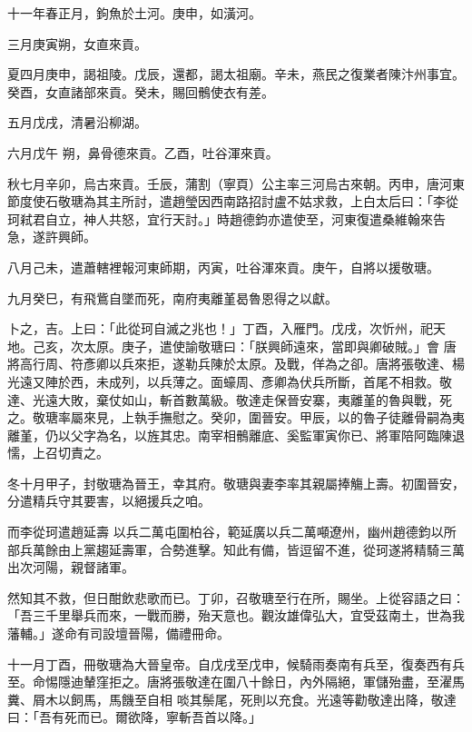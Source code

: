 \begin{pinyinscope}
 十一年春正月，鉤魚於土河。庚申，如潢河。



 三月庚寅朔，女直來貢。



 夏四月庚申，謁祖陵。戊辰，還都，謁太祖廟。辛未，燕民之復業者陳汴州事宜。癸酉，女直諸部來貢。癸未，賜回鶻使衣有差。



 五月戊戌，清暑沿柳湖。



 六月戊午
 朔，鼻骨德來貢。乙酉，吐谷渾來貢。



 秋七月辛卯，烏古來貢。壬辰，蒲割（寧頁）公主率三河烏古來朝。丙申，唐河東節度使石敬瑭為其主所討，遣趙瑩因西南路招討盧不姑求救，上白太后曰：「李從珂弒君自立，神人共怒，宜行天討。」時趙德鈞亦遣使至，河東復遣桑維翰來告急，遂許興師。



 八月己未，遣蕭轄裡報河東師期，丙寅，吐谷渾來貢。庚午，自將以援敬瑭。



 九月癸巳，有飛鴜自墜而死，南府夷離堇曷魯恩得之以獻。



 卜之，吉。上曰：「此從珂自滅之兆也！」丁酉，入雁門。戊戌，次忻州，祀天地。己亥，次太原。庚子，遣使諭敬瑭曰：「朕興師遠來，當即與卿破賊。」會
 唐將高行周、符彥卿以兵來拒，遂勒兵陳於太原。及戰，佯為之卻。唐將張敬達、楊光遠又陣於西，未成列，以兵薄之。面蠔周、彥卿為伏兵所斷，首尾不相救。敬達、光遠大敗，棄仗如山，斬首數萬級。敬達走保晉安寨，夷離堇的魯與戰，死之。敬瑭率屬來見，上執手撫慰之。癸卯，圍晉安。甲辰，以的魯子徒離骨嗣為夷離堇，仍以父字為名，以旌其忠。南宰相鶻離底、奚監軍寅你已、將軍陪阿臨陳退懦，上召切責之。



 冬十月甲子，封敬瑭為晉王，幸其府。敬瑭與妻李率其親屬捧觴上壽。初圍晉安，分遣精兵守其要害，以絕援兵之咱。



 而李從珂遣趙延壽
 以兵二萬屯圍柏谷，範延廣以兵二萬噸遼州，幽州趙德鈞以所部兵萬餘由上黨趨延壽軍，合勢進擊。知此有備，皆逗留不進，從珂遂將精騎三萬出次河陽，親督諸軍。



 然知其不救，但日酣飲悲歌而已。丁卯，召敬瑭至行在所，賜坐。上從容語之曰：「吾三千里舉兵而來，一戰而勝，殆天意也。觀汝雄偉弘大，宜受茲南土，世為我藩輔。」遂命有司設壇晉陽，備禮冊命。



 十一月丁酉，冊敬瑭為大晉皇帝。自戊戌至戊申，候騎雨奏南有兵至，復奏西有兵至。命惕隱迪輦窪拒之。唐將張敬達在圍八十餘日，內外隔絕，軍儲殆盡，至濯馬糞、屑木以飼馬，馬饑至自相
 啖其鬃尾，死則以充食。光遠等勸敬達出降，敬達曰：「吾有死而已。爾欲降，寧斬吾首以降。」




\end{pinyinscope}
